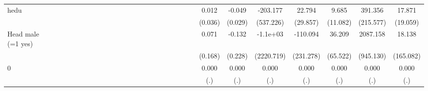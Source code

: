 {\begin{tabular}{l*{29}{c}}
hedu                &              &              &              &              &              &              &              &              &              &              &              &              &              &              &              &              &              &              &              &              &              &              &0.012         &-0.049         &-203.177         &22.794         &9.685         &391.356         &17.871         \\
                    &              &              &              &              &              &              &              &              &              &              &              &              &              &              &              &              &              &              &              &              &              &              &(0.036)         &(0.029)         &(537.226)         &(29.857)         &(11.082)         &(215.577)         &(19.059)         \\
Head male (=1 yes)  &              &              &              &              &              &              &              &              &              &              &              &              &              &              &              &              &              &              &              &              &              &              &0.071         &-0.132         &-1.1e+03         &-110.094         &36.209         &2087.158\sym{*}  &18.138         \\
                    &              &              &              &              &              &              &              &              &              &              &              &              &              &              &              &              &              &              &              &              &              &              &(0.168)         &(0.228)         &(2220.719)         &(231.278)         &(65.522)         &(945.130)         &(165.082)         \\
0                   &              &              &              &              &              &              &              &              &              &              &              &              &              &              &              &              &              &              &              &              &              &              &0.000         &0.000         &0.000         &0.000         &0.000         &0.000         &0.000         \\
                    &              &              &              &              &              &              &              &              &              &              &              &              &              &              &              &              &              &              &              &              &              &              &  (.)         &  (.)         &  (.)         &  (.)         &  (.)         &  (.)         &  (.)         \\

\end{tabular}}
